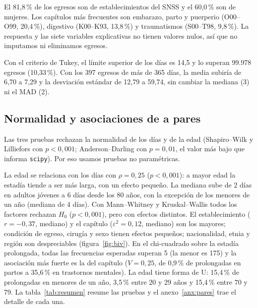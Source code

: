 \documentclass[10.5pt,a4paper,headings=small,abstract=false,bibliography=totoc,listof=totoc]{scrartcl}
\newcommand{\pct}{\,\%}
\newcommand{\anexo}[1]{anexo~\ref{#1}}
\begin{document}
El 81,8\pct{} de los egresos son de establecimientos del SNSS y el 60,0\pct{} son de mujeres. Los capítulos más frecuentes son embarazo, parto y puerperio (O00--O99, 20,4\pct{}), digestivo (K00--K93, 13,8\pct{}) y traumatismos (S00--T98, 9,8\pct{}). La respuesta y las siete variables explicativas no tienen valores nulos, así que no imputamos ni eliminamos egresos.

Con el criterio de Tukey, el límite superior de los días es 14,5 y lo superan 99.978 egresos (10,33\pct{}). Con los 397 egresos de más de 365 días, la media subiría de 6,70 a 7,29 y la desviación estándar de 12,79 a 59,74, sin cambiar la mediana (3) ni el MAD (2).

\subsection{Normalidad y asociaciones de a pares}

Las tres pruebas rechazan la normalidad de los días y de la edad (Shapiro--Wilk y Lilliefors con $p<0{,}001$; Anderson--Darling con $p=0{,}01$, el valor más bajo que informa \texttt{scipy}). Por eso usamos pruebas no paramétricas.

La edad se relaciona con los días con $\rho=0{,}25$ ($p<0{,}001$): a mayor edad la estadía tiende a ser más larga, con un efecto pequeño. La mediana sube de 2 días en adultos jóvenes a 6 días desde los 80 años, con la excepción de los menores de un año (mediana de 4 días). Con Mann--Whitney y Kruskal--Wallis todos los factores rechazan $H_0$ ($p<0{,}001$), pero con efectos distintos. El establecimiento ($r=-0{,}37$, mediano) y el capítulo ($\varepsilon^2=0{,}12$, mediano) son los mayores; condición de egreso, cirugía y sexo tienen efectos pequeños; nacionalidad, etnia y región son despreciables (figura~\ref{fig:biv}). En el chi-cuadrado sobre la estadía prolongada, todas las frecuencias esperadas superan 5 (la menor es 175) y la asociación más fuerte es la del capítulo ($V=0{,}25$, de 0,9\pct{} de prolongadas en partos a 35,6\pct{} en trastornos mentales). La edad tiene forma de U: 15,4\pct{} de prolongadas en menores de un año, 3,5\pct{} entre 20 y 29 años y 15,4\pct{} entre 70 y 79. La tabla~\ref{tab:resumen} resume las pruebas y el \anexo{anx:pares} trae el detalle de cada una.
\end{document}
